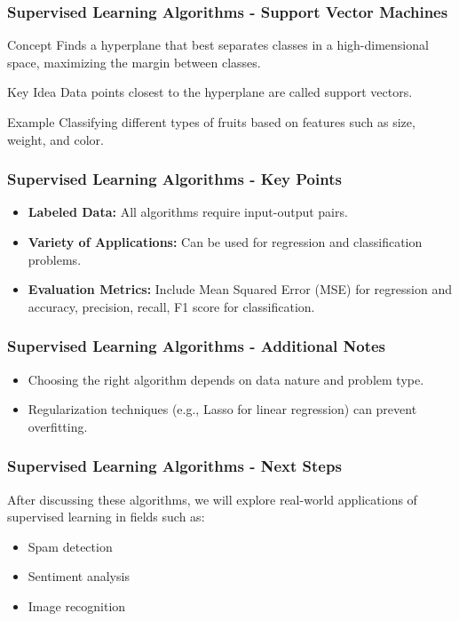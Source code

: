 \documentclass[aspectratio=169]{beamer}
\begin{document}
\begin{frame}[fragile]
    \frametitle{Supervised Learning Algorithms - Support Vector Machines}
    \begin{block}{Concept}
        Finds a hyperplane that best separates classes in a high-dimensional space, maximizing the margin between classes.
    \end{block}
    \begin{block}{Key Idea}
        Data points closest to the hyperplane are called support vectors.
    \end{block}
    \begin{block}{Example}
        Classifying different types of fruits based on features such as size, weight, and color.
    \end{block}
\end{frame}

\begin{frame}[fragile]
    \frametitle{Supervised Learning Algorithms - Key Points}
    \begin{itemize}
        \item \textbf{Labeled Data:} All algorithms require input-output pairs.
        \item \textbf{Variety of Applications:} Can be used for regression and classification problems.
        \item \textbf{Evaluation Metrics:} Include Mean Squared Error (MSE) for regression and accuracy, precision, recall, F1 score for classification.
    \end{itemize}
\end{frame}

\begin{frame}[fragile]
    \frametitle{Supervised Learning Algorithms - Additional Notes}
    \begin{itemize}
        \item Choosing the right algorithm depends on data nature and problem type.
        \item Regularization techniques (e.g., Lasso for linear regression) can prevent overfitting.
    \end{itemize}
\end{frame}

\begin{frame}[fragile]
    \frametitle{Supervised Learning Algorithms - Next Steps}
    After discussing these algorithms, we will explore real-world applications of supervised learning in fields such as:
    \begin{itemize}
        \item Spam detection
        \item Sentiment analysis
        \item Image recognition
    \end{itemize}
\end{frame}
\end{document}
